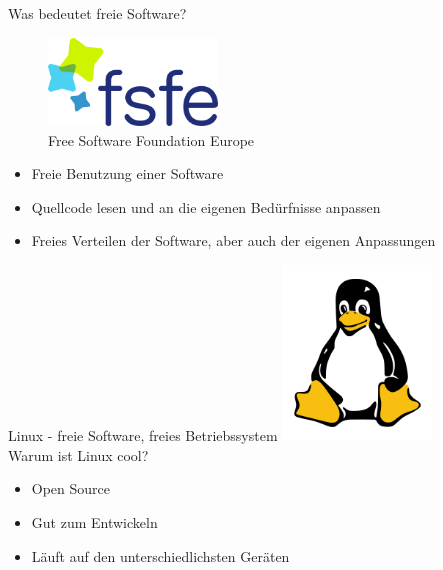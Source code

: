 \documentclass[utf8]{beamer}
\begin{document}
	\begin{frame}{Was bedeutet freie Software?}
	\begin{figure}
		\centering\includegraphics[width=0.4\textwidth]{img/Free_Software_Foundation_Europe,_logo.png}\\
		Free Software Foundation Europe
	\end{figure}
		
		\begin{itemize}
			\item Freie Benutzung einer Software
			\item Quellcode lesen und an die eigenen Bedürfnisse anpassen
			\item Freies Verteilen der Software, aber auch der eigenen Anpassungen
		\end{itemize}
	\end{frame}
	
	\begin{frame}{Linux - freie Software, freies Betriebssystem}
	\centering\includegraphics[width=0.3\textwidth]{img/Tux-simple.png}\\
		Warum ist Linux cool?
		\begin{itemize}
			\item Open Source
			\item Gut zum Entwickeln
			\item Läuft auf den unterschiedlichsten Geräten
		\end{itemize}
	\end{frame}
	
\end{document}
